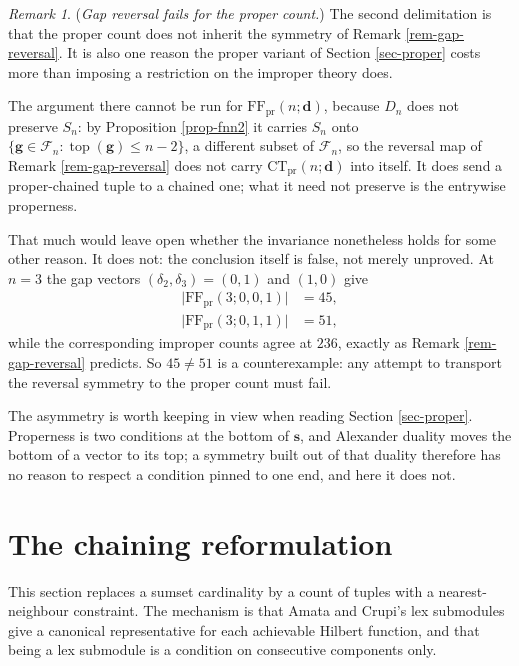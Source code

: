 \documentclass[11pt, a4paper, abstract=yes]{scrartcl}
\theoremstyle{definition}
\theoremstyle{remark}
\newtheorem{remark}[definition]{Remark}
\theoremstyle{plain}
\newcommand{\vek}[1]{\boldsymbol{#1}}
\newcommand{\tp}{\operatorname{top}}
\begin{document}
\begin{remark}
(\emph{Gap reversal fails for the proper count.}) The second delimitation is that the proper count does
not inherit the symmetry of Remark \ref{rem-gap-reversal}. It is also one reason the proper variant of
Section \ref{sec-proper} costs more than imposing a restriction on the improper theory does.

The argument there cannot be run for \(\mathrm{FF}_{\mathrm{pr}}(n;\vek d)\), because \(D_n\) does not
preserve \(S_n\): by Proposition \ref{prop-fnn2} it carries \(S_n\) onto
\(\lbrace\vek g\in\mathcal F_n:\tp(\vek g)\le n-2\rbrace\), a different subset of \(\mathcal F_n\), so
the reversal map of Remark \ref{rem-gap-reversal} does not carry \(\mathrm{CT}_{\mathrm{pr}}(n;\vek d)\)
into itself. It does send a proper-chained tuple to a chained one; what it need not preserve is the
entrywise properness.

That much would leave open whether the invariance nonetheless holds for some other reason. It does
not: the conclusion itself is false, not merely unproved. At \(n=3\) the gap vectors
\((\delta_2,\delta_3)=(0,1)\) and \((1,0)\) give
\begin{align}
  \lvert\mathrm{FF}_{\mathrm{pr}}(3;0,0,1)\rvert &= 45,\label{eq:proper-not-reversible}\\
  \lvert\mathrm{FF}_{\mathrm{pr}}(3;0,1,1)\rvert &= 51,\label{eq:proper-not-reversible-b}
\end{align}
while the corresponding improper counts agree at \(236\), exactly as Remark
\ref{rem-gap-reversal} predicts. So \(45\ne51\) is a counterexample: any attempt to transport the
reversal symmetry to the proper count must fail.

The asymmetry is worth keeping in view when reading Section \ref{sec-proper}. Properness is two
conditions at the bottom of \(\vek s\), and Alexander duality moves the bottom of a vector to its
top; a symmetry built out of that duality therefore has no reason to respect a condition pinned to
one end, and here it does not.
\label{rem-proper-not-reversible}
\end{remark}
\section{The chaining reformulation}
\label{sec-chaining}
This section replaces a sumset cardinality by a count of tuples with a nearest-neighbour constraint.
The mechanism is that Amata and Crupi's lex submodules give a canonical representative for each
achievable Hilbert function, and that being a lex submodule is a condition on consecutive components
only.
\end{document}
